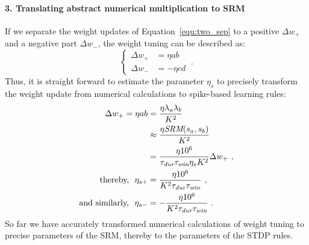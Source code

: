 

\paragraph{3. Translating abstract numerical multiplication to SRM\\}
If we separate the weight updates of Equation~\ref{equ:two_sep} to a positive $\Delta w_+$ and a negative part $\Delta w_-$, the weight tuning can be described as:
\begin{equation}
\left\{
\begin{aligned} 
\Delta w_+ &= \eta ab\\
\Delta w_- &= -\eta cd
\end{aligned}
\right.~.
\end{equation}
Thus, it is straight forward to estimate the parameter $\eta_s$ to precisely transform the weight update from numerical calculations to spike-based learning rules:
\begin{equation}
\begin{aligned} 
\Delta w_+ = \eta ab &=\frac{\eta \lambda_a \lambda_b}{K^2}\\
&\approx \frac{\eta \textit{\textrm{SRM}}(s_a, s_b)}{K^2}\\ &=
\frac{\eta 10^6}{\tau_{\textit{\textrm{dur}}}
	\tau_{\textit{\textrm{win}}}
	\eta_s K^2}
\Delta w_+~,\\
\textrm{thereby,~~}
\eta_{s+} &=  \frac{\eta 10^6}{K^2 \tau_{\textit{\textrm{dur}}} \tau_{\textit{\textrm{win}}}}~,\\
\textrm{and similarly,~~}
\eta_{s-} &=  -\frac{\eta 10^6}{K^2 \tau_{\textit{\textrm{dur}}} \tau_{\textit{\textrm{win}}}}~.
\end{aligned}
\label{equ:srm}
\end{equation}
So far we have accurately transformed numerical calculations of weight tuning to precise parameters of the SRM, thereby to the parameters of the STDP rules.


